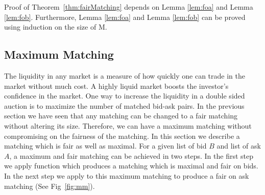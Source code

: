 \documentclass[a4paper,UKenglish,cleveref, autoref]{lipics-v2019}
\begin{document}
\begin{theorem}\label{thm:fairMatching}
\end{theorem}

Proof of Theorem~\ref{thm:fairMatching} depends on Lemma \ref{lem:foa} and Lemma \ref{lem:fob}. Furthermore, Lemma \ref{lem:foa} and Lemma \ref{lem:fob} can be proved using induction on the size of M. 

\subsection{Maximum Matching}

The liquidity in any market is a measure of how quickly one can trade in the market without much cost. A highly liquid market boosts the investor's confidence in the market. One way to increase the liquidity in a double sided auction is to maximize the number of matched bid-ask pairs. In the previous section we have seen that any matching can be changed to a fair matching without altering its size. Therefore, we can have a maximum matching without compromising on the fairness of the matching. In this section we describe a matching which is fair as well as maximal. For a given list of bid $B$ and list of ask $A$, a maximum and fair matching can be achieved in two steps. In the first step we apply function  which produces a matching which is maximal and fair on bids. In the next step we apply  to this maximum matching to produce a fair on ask matching (See Fig~\ref{fig:mm}).
\end{document}
